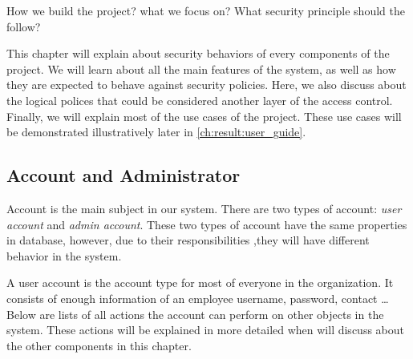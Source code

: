 How we build the project? what we focus on? What security principle should the follow?

This chapter will explain about security behaviors of every components of the project.
We will learn about all the main features of the system, as well as how they are expected to behave against security policies.
Here, we also discuss about the logical polices that could be considered another layer of the access control.
Finally, we will explain most of the use cases of the project.
These use cases will be demonstrated illustratively later in \autoref{ch:result:user_guide}.


\subsection{Account and Administrator}
\label{ch:hopot_project:project_components:account}

Account is the main subject in our system.
There are two types of account: \emph{user account} and \emph{admin account}.
These two types of account have the same properties in database, however, due to their responsibilities ,they will have different behavior in the system.

A user account is the account type for most of everyone in the organization.
It consists of enough information of an employee \eg username, password, contact \dots
Below are lists of all actions the account can perform on other objects in the system. These actions will be explained in more detailed when will discuss about the other components in this chapter.

